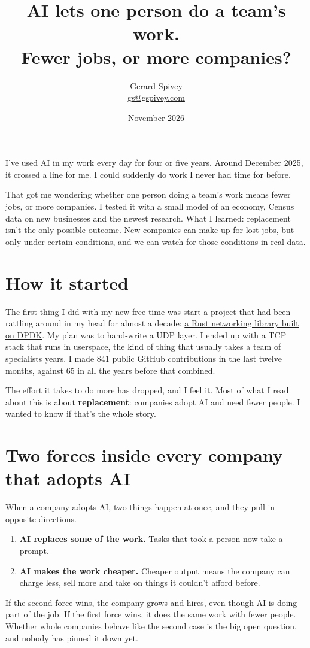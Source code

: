 \documentclass[11pt]{article}
\title{AI lets one person do a team's work.\\[0.3em]\large Fewer jobs, or more companies?}
\author{Gerard Spivey\\\href{mailto:gs@gspivey.com}{gs@gspivey.com}}
\date{November 2026}
\begin{document}
\maketitle

I've used AI in my work every day for four or five years. Around December 2025, it crossed a line for me. I could suddenly do work I never had time for before.

That got me wondering whether one person doing a team's work means fewer jobs, or more companies. I tested it with a small model of an economy, Census data on new businesses and the newest research. What I learned: replacement isn't the only possible outcome. New companies can make up for lost jobs, but only under certain conditions, and we can watch for those conditions in real data.

\section*{How it started}

The first thing I did with my new free time was start a project that had been rattling around in my head for almost a decade: \href{https://github.com/gspivey/dpdk-stdlib-rust}{a Rust networking library built on DPDK}. My plan was to hand-write a UDP layer. I ended up with a TCP stack that runs in userspace, the kind of thing that usually takes a team of specialists years. I made 841 public GitHub contributions in the last twelve months, against 65 in all the years before that combined.

The effort it takes to do more has dropped, and I feel it. Most of what I read about this is about \textbf{replacement}: companies adopt AI and need fewer people. I wanted to know if that's the whole story.

\section*{Two forces inside every company that adopts AI}

When a company adopts AI, two things happen at once, and they pull in opposite directions.
\begin{enumerate}
  \item \textbf{AI replaces some of the work.} Tasks that took a person now take a prompt.
  \item \textbf{AI makes the work cheaper.} Cheaper output means the company can charge less, sell more and take on things it couldn't afford before.
\end{enumerate}
If the second force wins, the company grows and hires, even though AI is doing part of the job. If the first force wins, it does the same work with fewer people. Whether whole companies behave like the second case is the big open question, and nobody has pinned it down yet.
\end{document}
